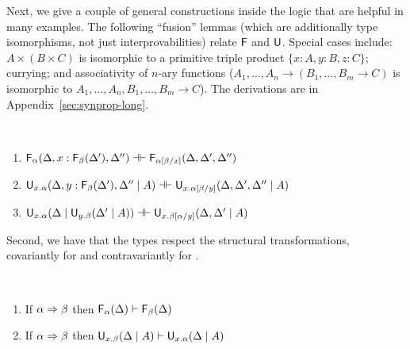 Next, we give a couple of general constructions inside the logic that
are helpful in many examples.  The following ``fusion'' lemmas (which
are additionally type isomorphisms, not just interprovabilities) relate
$\mathsf{F}$ and $\mathsf{U}$.  Special cases include: $A \times (B \times C)$
is isomorphic to a primitive triple product $\{x:A,y:B,z:C\}$; currying;
and associativity of $n$-ary functions ($A_1,\ldots,A_n \to
(B_1,\ldots,B_m \to C)$ is isomorphic to $A_1,\ldots,A_n,B_1,\ldots,B_m
\to C$).  The derivations are in Appendix~\ref{sec:synprop-long}.

\begin{lemma}[Fusion] ~ \label{lem:fusion}
\begin{enumerate} 

\item $\mathsf{F}_{\alpha}(\Delta,x:\mathsf{F}_{\beta}(\Delta'),\Delta'') \dashv \vdash
  \mathsf{F}_{\alpha[\beta/x]}(\Delta,\Delta',\Delta'')$

\item $\mathsf{U}_{x.\alpha}(\Delta,y:\mathsf{F}_{\beta}(\Delta'),\Delta'' \mid A) \dashv \vdash
  \mathsf{U}_{x.\alpha[\beta/y]}(\Delta,\Delta',\Delta'' \mid A)$

\item 
$\mathsf{U}_{x.\alpha}(\Delta \mid \mathsf{U}_{y.\beta}(\Delta' \mid A)) \dashv \vdash
 \mathsf{U}_{x.\beta[\alpha/y]}(\Delta,\Delta' \mid A)$

\end{enumerate}
\end{lemma}

Second, we have that the types respect the structural transformations,
covariantly for \Fsymb\/ and contravariantly for \Usymb\/.

\begin{lemma} ~ \label{lem:typespr}
\begin{enumerate}
\item 
 If $\alpha \Rightarrow \beta$ then $\mathsf{F}_{\alpha}(\Delta) \vdash
 \mathsf{F}_{\beta}(\Delta)$

\item If $\alpha \Rightarrow \beta$ then $\mathsf{U}_{x.\beta}(\Delta \mid A) \vdash
  \mathsf{U}_{x.\alpha}(\Delta \mid A)$
\end{enumerate}
\end{lemma}
